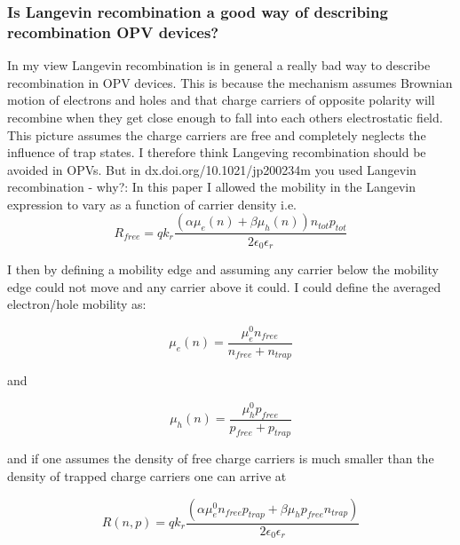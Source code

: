\documentclass[11pt]{article}
\begin{document}
\subsubsection{Is Langevin recombination a good way of describing recombination OPV devices?}
In my view Langevin recombination is in general a really bad way to describe recombination in OPV devices.  This is because the mechanism assumes Brownian motion of electrons and holes and that charge carriers of opposite polarity will recombine when they get close enough to fall into each others electrostatic field.  This picture assumes the charge carriers are free and completely neglects the influence of trap states.  I therefore think Langeving recombination should be avoided in OPVs.
But in dx.doi.org/10.1021/jp200234m you used Langevin recombination - why?: In this paper I allowed the mobility in the Langevin expression to vary as a function of carrier density i.e.
\begin{equation}
R_{free}=q k_{r}\frac{(\alpha \mu_e(n)+\beta \mu_h(n)) n_{tot} p_{tot}}{2\epsilon_0\epsilon_r}
\end{equation}

I then by defining a mobility edge and assuming any carrier below the mobility edge could not move and any carrier above it could.  I could define the averaged electron/hole mobility as: 

\begin{equation}
\mu_e(n)=\frac{\mu_e^0 n_{free}}{n_{free}+n_{trap}}
\end{equation}

and

\begin{equation}
\mu_h(n)=\frac{\mu_h^0 p_{free}}{p_{free}+p_{trap}}
\end{equation}

and if one assumes the density of free charge carriers is much smaller than the density of trapped charge carriers one can arrive at

\begin{equation}
R(n,p)=q k_{r}\frac{(\alpha \mu_e^0 n_{free} p_{trap}+\beta \mu_h p_{free} n_{trap}) }{2\epsilon_0\epsilon_r}
\end{equation}
\end{document}
